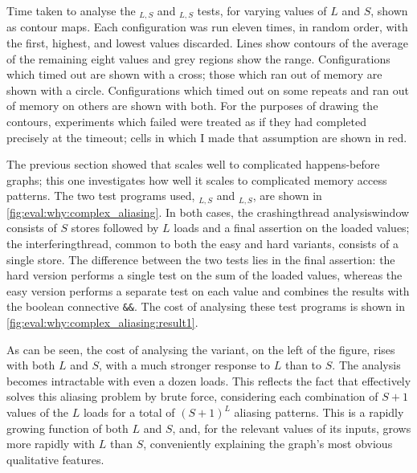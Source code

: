 \begin{sanefig}
  \caption{Time taken to analyse the
    $_{L,S}$ and
    $_{L,S}$ tests, for varying values
    of $L$ and $S$, shown as contour maps.  Each configuration was run
    eleven times, in random order, with the first, highest, and lowest
    values discarded.  Lines show contours of the average of the
    remaining eight values and grey regions show the range.
    Configurations which timed out are shown with a cross; those which
    ran out of memory are shown with a circle.  Configurations which
    timed out on some repeats and ran out of memory on others are
    shown with both.  For the purposes of drawing the contours,
    experiments which failed were treated as if they had completed
    precisely at the timeout; cells in which I made that assumption
    are shown in red.}
  \label{fig:eval:why:complex_aliasing:result1}
\end{sanefig}

\noindent
The previous section showed that {\implementation} scales well to
complicated happens-before graphs; this one investigates how well it
scales to complicated memory access patterns.  The two test programs
used, $_{L,S}$ and
$_{L,S}$, are shown in
\autoref{fig:eval:why:complex_aliasing}.  In both cases, the
\gls{crashingthread} \gls{analysiswindow} consists of $S$ stores
followed by $L$ loads and a final assertion on the loaded values; the
\gls{interferingthread}, common to both the easy and hard variants,
consists of a single store.  The difference between the two tests lies
in the final assertion: the hard version performs a single test on the
sum of the loaded values, whereas the easy version performs a separate
test on each value and combines the results with the boolean
connective \texttt{\&\&}.  The cost of analysing these test programs
is shown in \autoref{fig:eval:why:complex_aliasing:result1}.

As can be seen, the cost of analysing the  variant, on
the left of the figure, rises with both $L$ and $S$, with a much
stronger response to $L$ than to $S$.  The analysis becomes
intractable with even a dozen loads.  This reflects the fact that
{\implementation} effectively solves this aliasing problem by brute
force, considering each combination of $S+1$ values of the $L$ loads
for a total of $(S+1)^L$ aliasing patterns.  This is a rapidly growing
function of both $L$ and $S$, and, for the relevant values of its
inputs, grows more rapidly with $L$ than $S$, conveniently explaining
the graph's most obvious qualitative features.\kern-1pt

